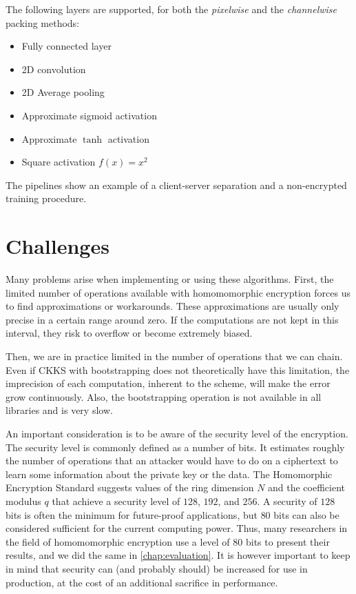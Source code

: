 \documentclass[a4paper,11pt,oneside]{report}
\begin{document}
The following layers are supported, for both the \emph{pixelwise} and the \emph{channelwise} packing methods:
\begin{itemize}
  \item Fully connected layer
  \item 2D convolution
  \item 2D Average pooling
  \item Approximate sigmoid activation
  \item Approximate $\tanh$ activation
  \item Square activation $f(x) = x^2$
\end{itemize}

The pipelines show an example of a client-server separation and a non-encrypted training procedure.


\section{Challenges}

Many problems arise when implementing or using these algorithms. 
First, the limited number of operations available with homomomorphic encryption forces us to find approximations or workarounds. 
These approximations are usually only precise in a certain range around zero. 
If the computations are not kept in this interval, they risk to overflow or become extremely biased.

Then, we are in practice limited in the number of operations that we can chain. 
Even if CKKS with bootstrapping does not theoretically have this limitation, the imprecision of each computation, inherent to the scheme, will make the error grow continuously.
Also, the bootstrapping operation is not available in all libraries and is very slow.

An important consideration is to be aware of the security level of the encryption. 
The security level is commonly defined as a number of bits. 
It estimates roughly the number of operations that an attacker would have to do on a ciphertext to learn some information about the private key or the data.
The Homomorphic Encryption Standard \cite{albrecht_homomorphic_2021} suggests values of the ring dimension $N$ and the coefficient modulus $q$ that achieve a security level of $128$, $192$, and $256$. 
A security of $128$ bits is often the minimum for future-proof applications, but $80$ bits can also be considered sufficient for the current computing power.
Thus, many researchers in the field of homomomorphic encryption use a level of $80$ bits to present their results, and we did the same in \autoref{chap:evaluation}.
It is however important to keep in mind that security can (and probably should) be increased for use in production, at the cost of an additional sacrifice in performance.
\end{document}
